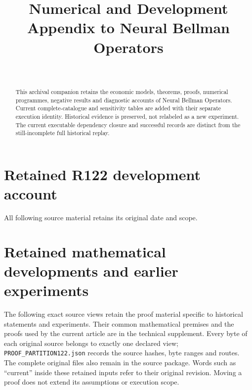 \documentclass[ecta,nameyear,draft]{econsocart}
\begin{document}
\begin{frontmatter}
\title{Numerical and Development Appendix to Neural Bellman Operators}
\begin{aug}
\author[id=au1,addressref={add1}]{~}
\address[id=add1]{Peking University}
\end{aug}
\begin{abstract}This archival companion retains the economic models, theorems, proofs, numerical programmes, negative results and diagnostic accounts of Neural Bellman Operators. Current complete-catalogue and sensitivity tables are added with their separate execution identity. Historical evidence is preserved, not relabeled as a new experiment. The current executable dependency closure and successful records are distinct from the still-incomplete full historical replay.\end{abstract}
\end{frontmatter}
\appendix
\renewcommand{\thetheorem}{A.\arabic{theorem}}
\renewcommand{\theequation}{A.\arabic{equation}}
\renewcommand{\thesection}{\AlphAlph{\value{section}}}




\section{Retained R122 development account}
All following source material retains its original date and scope.

\section{Retained mathematical developments and earlier experiments}
\label{dev:proofpartition122}
The following exact source views retain the proof material specific to
historical statements and experiments. Their common mathematical premises
and the proofs used by the current article are in the technical supplement.
Every byte of each original source belongs to exactly one declared view;
\texttt{PROOF\_PARTITION122.json} records the source hashes, byte ranges
and routes. The complete original files also remain in the source package.
Words such as ``current'' inside these retained inputs refer to their original
revision. Moving a proof does not extend its assumptions or execution scope.















\end{document}
